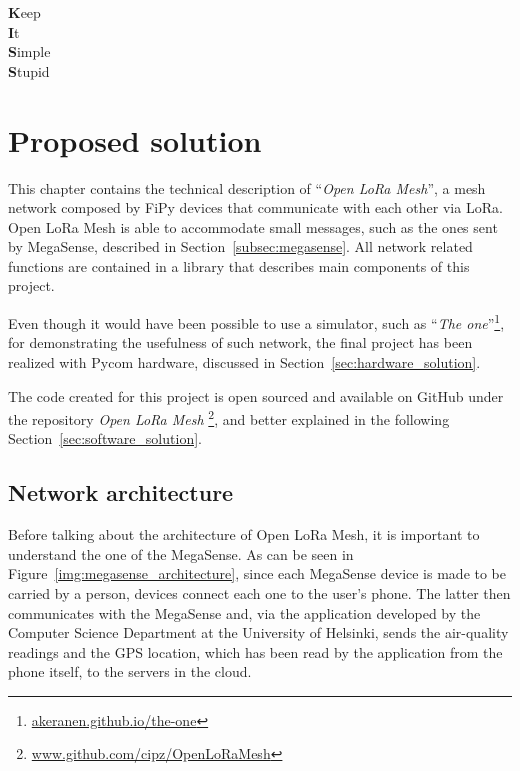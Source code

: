 
\begin{savequote}[40mm]
	\textbf{K}eep\\
	\textbf{I}t\\
	\textbf{S}imple\\
	\textbf{S}tupid
\end{savequote}

\chapter{Proposed solution}\label{chapter:proposed_solution}

	This chapter contains the technical description of ``\textit{Open LoRa Mesh}'', a mesh network composed by FiPy devices that communicate with each other via LoRa.
	Open LoRa Mesh is able to accommodate small messages, such as the ones sent by MegaSense, described in Section~\ref{subsec:megasense}.
	All network related functions are contained in a library that describes main components of this project.

	Even though it would have been possible to use a simulator, such as ``\textit{The one}''\footnote{ \url{akeranen.github.io/the-one}}, for demonstrating the usefulness of such network, the final project has been realized with Pycom hardware, discussed in Section~\ref{sec:hardware_solution}.
	
	The code created for this project is open sourced and available on GitHub under the repository \textit{Open LoRa Mesh} \footnote{ \url{www.github.com/cipz/OpenLoRaMesh}}, and better explained in the following Section~\ref{sec:software_solution}.
	
	\section{Network architecture}\label{sec:architecture}
		
		Before talking about the architecture of Open LoRa Mesh, it is important to understand the one of the MegaSense.
		As can be seen in Figure~\ref{img:megasense_architecture}, since each MegaSense device is made to be carried by a person, devices connect each one to the user's phone.
		The latter then communicates with the MegaSense and, via the application developed by the Computer Science Department at the University of Helsinki, sends the air-quality readings and the GPS location, which has been read by the application from the phone itself, to the servers in the cloud.
		
